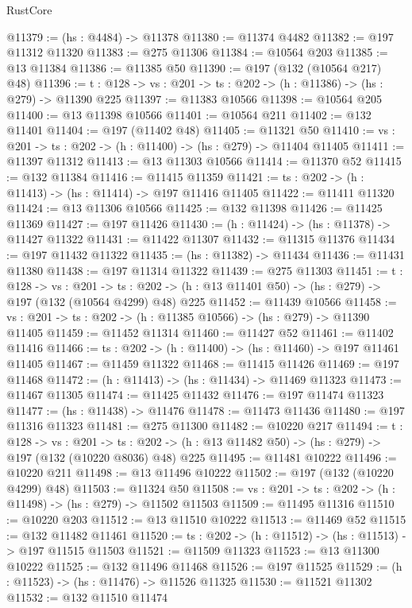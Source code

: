 \begin{lexlean}{RustCore}
\begin{coremodule}
@11379 := (hs : @4484) -> @11378
@11380 := @11374 @4482
@11382 := @197 @11312 @11320
@11383 := @275 @11306
@11384 := @10564 @203
@11385 := @13 @11384
@11386 := @11385 @50
@11390 := @197 (@132 (@10564 @217) @48)
@11396 := {t : @128} -> {vs : @201} -> {ts : @202} -> (h : @11386) -> (hs : @279) -> @11390 @225
@11397 := @11383 @10566
@11398 := @10564 @205
@11400 := @13 @11398 @10566
@11401 := @10564 @211
@11402 := @132 @11401
@11404 := @197 (@11402 @48)
@11405 := @11321 @50
@11410 := {vs : @201} -> {ts : @202} -> (h : @11400) -> (hs : @279) -> @11404 @11405
@11411 := @11397 @11312
@11413 := @13 @11303 @10566
@11414 := @11370 @52
@11415 := @132 @11384
@11416 := @11415 @11359
@11421 := {ts : @202} -> (h : @11413) -> (hs : @11414) -> @197 @11416 @11405
@11422 := @11411 @11320
@11424 := @13 @11306 @10566
@11425 := @132 @11398
@11426 := @11425 @11369
@11427 := @197 @11426
@11430 := (h : @11424) -> (hs : @11378) -> @11427 @11322
@11431 := @11422 @11307
@11432 := @11315 @11376
@11434 := @197 @11432 @11322
@11435 := (hs : @11382) -> @11434
@11436 := @11431 @11380
@11438 := @197 @11314 @11322
@11439 := @275 @11303
@11451 := {t : @128} ->
  {vs : @201} ->
  {ts : @202} -> (h : @13 @11401 @50) -> (hs : @279) -> @197 (@132 (@10564 @4299) @48) @225
@11452 := @11439 @10566
@11458 := {vs : @201} -> {ts : @202} -> (h : @11385 @10566) -> (hs : @279) -> @11390 @11405
@11459 := @11452 @11314
@11460 := @11427 @52
@11461 := @11402 @11416
@11466 := {ts : @202} -> (h : @11400) -> (hs : @11460) -> @197 @11461 @11405
@11467 := @11459 @11322
@11468 := @11415 @11426
@11469 := @197 @11468
@11472 := (h : @11413) -> (hs : @11434) -> @11469 @11323
@11473 := @11467 @11305
@11474 := @11425 @11432
@11476 := @197 @11474 @11323
@11477 := (hs : @11438) -> @11476
@11478 := @11473 @11436
@11480 := @197 @11316 @11323
@11481 := @275 @11300
@11482 := @10220 @217
@11494 := {t : @128} ->
  {vs : @201} ->
  {ts : @202} -> (h : @13 @11482 @50) -> (hs : @279) -> @197 (@132 (@10220 @8036) @48) @225
@11495 := @11481 @10222
@11496 := @10220 @211
@11498 := @13 @11496 @10222
@11502 := @197 (@132 (@10220 @4299) @48)
@11503 := @11324 @50
@11508 := {vs : @201} -> {ts : @202} -> (h : @11498) -> (hs : @279) -> @11502 @11503
@11509 := @11495 @11316
@11510 := @10220 @203
@11512 := @13 @11510 @10222
@11513 := @11469 @52
@11515 := @132 @11482 @11461
@11520 := {ts : @202} -> (h : @11512) -> (hs : @11513) -> @197 @11515 @11503
@11521 := @11509 @11323
@11523 := @13 @11300 @10222
@11525 := @132 @11496 @11468
@11526 := @197 @11525
@11529 := (h : @11523) -> (hs : @11476) -> @11526 @11325
@11530 := @11521 @11302
@11532 := @132 @11510 @11474

\end{coremodule}
\end{lexlean}
